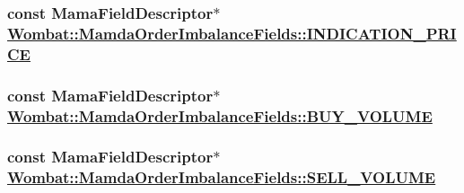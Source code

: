 \hypertarget{classWombat_1_1MamdaOrderImbalanceFields_777310b974e5fd0a2bf5b81f9e6d2ad6}{
\subsubsection[INDICATION\_\-PRICE]{\setlength{\rightskip}{0pt plus 5cm}const Mama\-Field\-Descriptor$\ast$ \hyperlink{classWombat_1_1MamdaOrderImbalanceFields_777310b974e5fd0a2bf5b81f9e6d2ad6}{Wombat::Mamda\-Order\-Imbalance\-Fields::INDICATION\_\-PRICE}}}
\label{classWombat_1_1MamdaOrderImbalanceFields_777310b974e5fd0a2bf5b81f9e6d2ad6}


\hypertarget{classWombat_1_1MamdaOrderImbalanceFields_8ef5e1d4798c6e79032e47293b7af077}{
\subsubsection[BUY\_\-VOLUME]{\setlength{\rightskip}{0pt plus 5cm}const Mama\-Field\-Descriptor$\ast$ \hyperlink{classWombat_1_1MamdaOrderImbalanceFields_8ef5e1d4798c6e79032e47293b7af077}{Wombat::Mamda\-Order\-Imbalance\-Fields::BUY\_\-VOLUME}}}
\label{classWombat_1_1MamdaOrderImbalanceFields_8ef5e1d4798c6e79032e47293b7af077}


\hypertarget{classWombat_1_1MamdaOrderImbalanceFields_28f0f32a539c9d2853b4bce666d1bf8f}{
\subsubsection[SELL\_\-VOLUME]{\setlength{\rightskip}{0pt plus 5cm}const Mama\-Field\-Descriptor$\ast$ \hyperlink{classWombat_1_1MamdaOrderImbalanceFields_28f0f32a539c9d2853b4bce666d1bf8f}{Wombat::Mamda\-Order\-Imbalance\-Fields::SELL\_\-VOLUME}}}
\label{classWombat_1_1MamdaOrderImbalanceFields_28f0f32a539c9d2853b4bce666d1bf8f}


